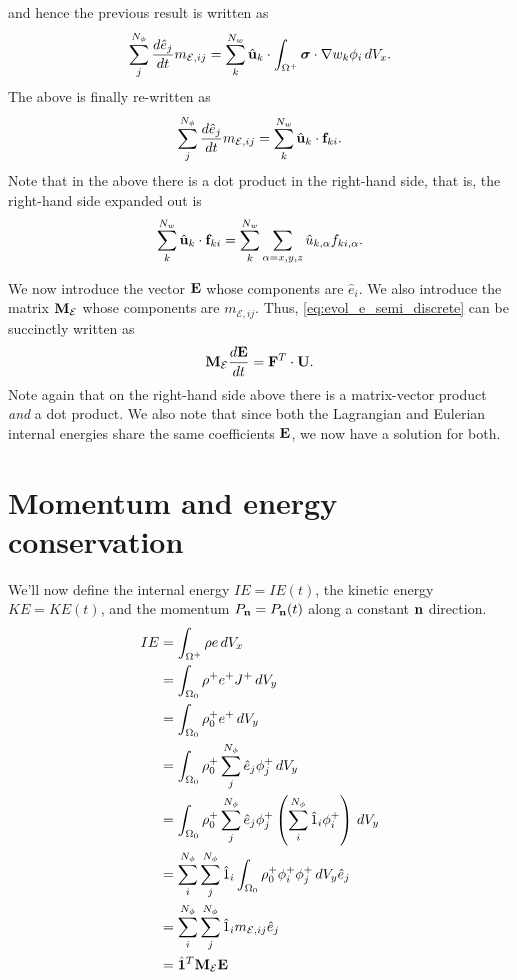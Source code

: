 \documentclass[11pt]{report}
\begin{document}
and hence the previous result is written as
\begin{equation}
    \sum_j^{N_\phi} \frac{d \hat{e}_j}{dt} m_{\mathcal{E},ij} = \sum_k^{N_w} \hat{\mathbf{u}}_k \cdot \int_{\Omega^+} \bm \sigma \cdot \nabla w_k \phi_i \, dV_x.
\end{equation}
The above is finally re-written as
\begin{equation}
    \label{eq:evol_e_semi_discrete}
    \sum_j^{N_\phi} \frac{d \hat{e}_j}{d t} m_{\mathcal{E},ij} = \sum_k^{N_w} \hat{\mathbf{u}}_k \cdot \mathbf{f}_{ki}.
\end{equation}
Note that in the above there is a dot product in the right-hand side, that is, the right-hand side expanded out is  
\begin{equation}
    \sum_k^{N_w} \hat{\mathbf{u}}_k \cdot \mathbf{f}_{ki} = \sum_k^{N_w} \sum_{\alpha=x,y,z} \hat{u}_{k,\alpha} f_{ki,\alpha}.
\end{equation}

We now introduce the vector $\mathbf{E}$ whose components are $\hat{e}_i$. We also introduce the matrix $\mathbf{M}_\mathcal{E}$ whose components are $m_{\mathcal{E},ij}$. Thus, \cref{eq:evol_e_semi_discrete} can be succinctly written as
\begin{equation}
    \label{eq:evol_energy_semi_discrete}
    \mathbf{M}_\mathcal{E} \frac{d\mathbf{E}}{dt} = \mathbf{F}^T \cdot \mathbf{U}.
\end{equation}
Note again that on the right-hand side above there is a matrix-vector product \textit{and} a dot product. We also note that since both the Lagrangian and Eulerian internal energies share the same coefficients $\mathbf{E}$, we now have a solution for both.

\section{Momentum and energy conservation}
We'll now define the internal energy $IE=IE(t)$, the kinetic energy $KE=KE(t)$, and the momentum $P_{\mathbf{n}}=P_{\mathbf{n}}(t)$ along a constant $\mathbf{n}$ direction.
\begin{align}
    IE &= \int_{\Omega^+} \rho e \, dV_x \nonumber \\
    &= \int_{\Omega_0} \rho^+ e^+ J^+ \, dV_y \nonumber \\
    &= \int_{\Omega_0} \rho^+_0 e^+ \, dV_y \nonumber \\
    &= \int_{\Omega_0} \rho_0^+ \sum_{j}^{N_\phi} \hat{e}_j \phi_j^+ \, dV_y \nonumber \\
    &= \int_{\Omega_0} \rho_0^+ \sum_{j}^{N_\phi} \hat{e}_j \phi_j^+ \left ( \sum_{i}^{N_\phi} \hat{1}_i \phi^+_i \right ) \, dV_y \nonumber \\
    &= \sum_i^{N_\phi} \sum_j^{N_\phi} \hat{1}_i \int_{\Omega_0} \rho_0^+ \phi_i^+ \phi_j^+ \, dV_y \hat{e}_j \nonumber \\
    &= \sum_i^{N_\phi} \sum_j^{N_\phi} \hat{1}_i m_{\mathcal{E},ij} \hat{e}_j \nonumber \\
    &= \hat{\mathbf{1}}^T \mathbf{M}_\mathcal{E} \mathbf{E} 
\end{align}
\end{document}

